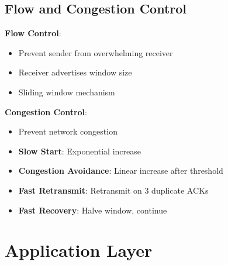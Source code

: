 \documentclass[12pt,a4paper]{report}
\begin{document}
\subsection{Flow and Congestion Control}
\begin{concept}
\textbf{Flow Control}:
\begin{itemize}
    \item Prevent sender from overwhelming receiver
    \item Receiver advertises window size
    \item Sliding window mechanism
\end{itemize}

\textbf{Congestion Control}:
\begin{itemize}
    \item Prevent network congestion
    \item \textbf{Slow Start}: Exponential increase
    \item \textbf{Congestion Avoidance}: Linear increase after threshold
    \item \textbf{Fast Retransmit}: Retransmit on 3 duplicate ACKs
    \item \textbf{Fast Recovery}: Halve window, continue
\end{itemize}
\end{concept}

\section{Application Layer}
\end{document}
